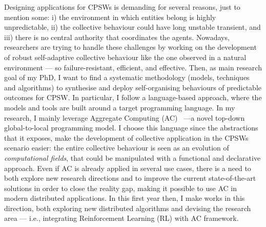 \documentclass[11pt]{article}
\begin{document}
Designing applications for CPSWs is demanding for several reasons, just to mention some:
 i) the environment in which entities belong is highly unpredictable,
 ii) the collective behaviour could have long unstable transient, and
 iii) there is no central authority that coordinates the agents. 
%
Nowadays, researchers are trying to handle these challenges by working 
 on the development of robust self-adaptive collective behaviour
 like the one observed in a natural environment --- so failure-resistant, efficient, and effective. 
%
Then, as main research goal of my PhD, I want to find a systematic methodology (models, techniques and algorithms) 
 to synthesise and deploy self-organising behaviours of predictable outcomes for CPSW.
%
In particular, I follow a language-based approach, where the models and tools are built around
 a target programming language.
%
In my research, 
 I mainly leverage Aggregate Computing (AC)~\cite{beal2015aggregate} ---a novel top-down global-to-local programming model. 
%
I choose this language since the abstractions that it exposes, 
 make the development of collective application in the CPSWs scenario easier:
 the entire collective behaviour is seen as an evolution of \textit{computational fields},
 that could be manipulated with a functional and declarative approach.
%
Even if AC is already applied in several use cases, 
 there is a need to both explore new research directions and
 to improve the current state-of-the-art solutions in order to close the reality gap, 
 making it possible to use AC in modern distributed applications.
%
In this first year then, 
 I make works in this direction, 
 both exploring new distributed algorithms and devising the research area 
 --- i.e., integrating Reinforcement Learning (RL) with AC framework. 
\end{document}
